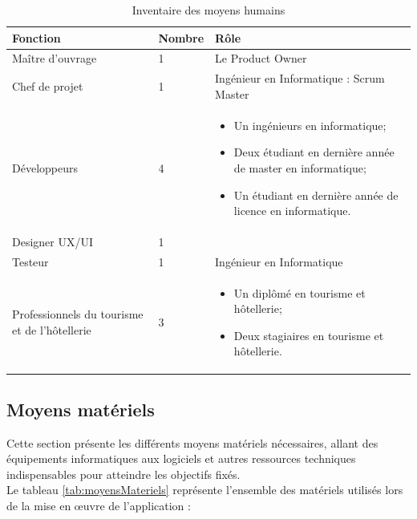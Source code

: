 \documentclass[12pt]{report}
\begin{document}
				\begin{longtable}{|p{5cm}|p{3cm}|p{6cm}|}
				\caption{Inventaire des moyens humains}
				\label{tab:moyensHumains}\\
				      \hline
				      \textbf{Fonction} & \textbf{Nombre} & \textbf{Rôle}\\
				      \hline
				\endfirsthead
				\endhead
				      Maître d’ouvrage & 	1  & Le Product Owner\\
				     \hline
				     Chef de projet & 1 & Ingénieur en Informatique : Scrum Master\\
					\hline
 						Développeurs & 4 & 
					\begin{itemize}
						\item Un ingénieurs en informatique;
						\item Deux étudiant en dernière année de master en informatique;
						\item Un étudiant en dernière année de licence en informatique.
					\end{itemize}\\						

					\hline
					Designer UX/UI & 1 &\\
					\hline
					Testeur & 1 & Ingénieur en Informatique\\
					\hline
					Professionnels du tourisme et de l'hôtellerie & 3 &
					\begin{itemize}
						\item Un diplômé en tourisme et hôtellerie;
						\item Deux stagiaires en tourisme et hôtellerie.
					\end{itemize}\\
 						\hline 
				\end{longtable}
				\FloatBarrier

				\subsection{Moyens matériels}

				\hspace{15pt} Cette section présente les différents moyens matériels nécessaires, allant des équipements informatiques aux logiciels et autres ressources techniques indispensables pour atteindre les objectifs fixés.\\

				Le tableau \ref{tab:moyensMateriels} représente l’ensemble des matériels utilisés lors de la mise en œuvre de l’application :
\end{document}
